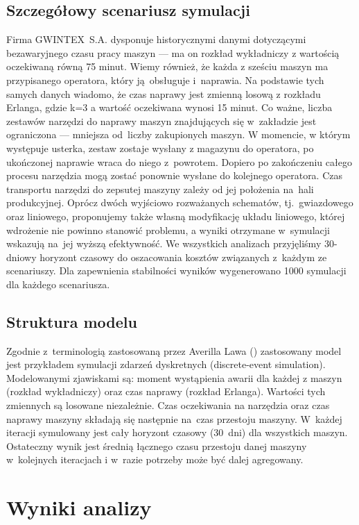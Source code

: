 \documentclass[12pt, a4paper, oneside]{mwart} %
\begin{document}
\subsection{Szczegółowy scenariusz symulacji}

Firma GWINTEX~S.A. dysponuje historycznymi danymi dotyczącymi bezawaryjnego czasu pracy maszyn --- ma on rozkład wykładniczy z wartością oczekiwaną równą 75 minut. Wiemy również, że każda z sześciu maszyn ma przypisanego operatora, który ją~obsługuje i~naprawia. Na podstawie tych samych danych wiadomo, że czas naprawy jest zmienną losową z rozkładu Erlanga, gdzie k=3 a wartość oczekiwana wynosi 15 minut. Co ważne, liczba zestawów narzędzi do naprawy maszyn znajdujących się w~zakładzie jest ograniczona --- mniejsza od~liczby zakupionych maszyn. W momencie, w którym występuje usterka, zestaw zostaje wysłany z magazynu do operatora, po ukończonej naprawie wraca do niego z~powrotem. Dopiero po zakończeniu całego procesu narzędzia mogą zostać ponownie wysłane do kolejnego operatora. Czas transportu narzędzi do zepsutej maszyny zależy od jej położenia na~hali produkcyjnej. Oprócz dwóch wyjściowo rozważanych schematów, tj.~gwiazdowego oraz liniowego, proponujemy także własną modyfikację układu liniowego, której wdrożenie nie powinno stanowić problemu, a wyniki otrzymane w~symulacji wskazują na~jej wyższą efektywność. We wszystkich analizach przyjęliśmy 30-dniowy horyzont czasowy do oszacowania kosztów związanych z~każdym ze scenariuszy. Dla zapewnienia stabilności wyników wygenerowano 1000 symulacji dla każdego scenariusza.

\subsection{Struktura modelu}
Zgodnie z~terminologią zastosowaną przez Averilla Lawa (\cite{law}) zastosowany model jest przykładem symulacji zdarzeń dyskretnych (discrete-event simulation). Modelowanymi zjawiskami są: moment wystąpienia awarii dla każdej z maszyn (rozkład wykładniczy) oraz czas naprawy (rozkład Erlanga). Wartości tych zmiennych są losowane niezależnie. Czas oczekiwania na narzędzia oraz czas naprawy maszyny składają się następnie na~czas przestoju maszyny. W~każdej iteracji symulowany jest cały horyzont czasowy (30~dni) dla wszystkich maszyn. Ostateczny wynik jest średnią łącznego czasu przestoju danej maszyny w~kolejnych iteracjach i w~razie potrzeby może być dalej agregowany.

\section{Wyniki analizy}
\end{document}
